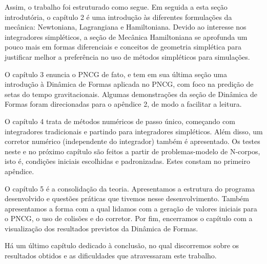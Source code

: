 Assim, o trabalho foi estruturado como segue. Em seguida a esta seção introdutória, o capítulo 2 é uma introdução às diferentes formulações da mecânica: Newtoniana, Lagrangiana e Hamiltoniana. Devido ao interesse nos integradores simpléticos, a seção de Mecânica Hamiltoniana se aprofunda um pouco mais em formas diferenciais e conceitos de geometria simplética para justificar melhor a preferência no uso de métodos simpléticos para simulações.

O capítulo 3 enuncia o PNCG de fato, e tem em sua última seção uma introdução à Dinâmica de Formas aplicada no PNCG, com foco na predição de setas do tempo gravita\-cionais. Algumas demonstrações da seção de Dinâmica de Formas foram direcionadas para o apêndice 2, de modo a facilitar a leitura.

O capítulo 4 trata de métodos numéricos de passo único, começando com integradores tradicionais e partindo para integradores simpléticos. Além disso, um corretor numérico (independente do integrador) também é apresentado. Os testes neste e no próximo capítulo são feitos a partir de problemas-modelo de N-corpos, isto é, condições iniciais escolhidas e padronizadas. Estes constam no primeiro apêndice.

O capítulo 5 é a consolidação da teoria. Apresentamos a estrutura do programa desenvolvido e questões práticas que tivemos nesse desenvolvimento. Também apresentamos a forma com a qual lidamos com a geração de valores iniciais para o PNCG, o uso de colisões e do corretor. Por fim, encerramos o capítulo com a visualização dos resultados previstos da Dinâmica de Formas.

Há um último capítulo dedicado à conclusão, no qual discorremos sobre os resultados obtidos e as dificuldades que atravessaram este trabalho.





